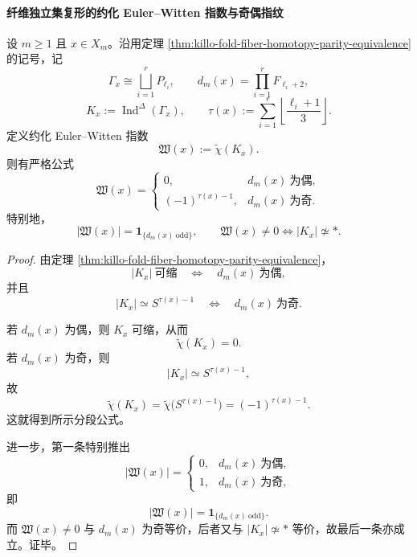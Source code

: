 \paragraph{纤维独立集复形的约化 Euler--Witten 指数与奇偶指纹}

\begin{theorem}\label{thm:xi-time-part62dg-fiber-reduced-euler-witten-parity}
设 \(m\ge 1\) 且 \(x\in X_m\)。沿用定理 \ref{thm:killo-fold-fiber-homotopy-parity-equivalence} 的记号，记
\[
\Gamma_x\cong\bigsqcup_{i=1}^{r}P_{\ell_i},
\qquad
d_m(x)=\prod_{i=1}^{r}F_{\ell_i+2},
\]
\[
K_x:=\operatorname{Ind}^{\Delta}(\Gamma_x),
\qquad
\tau(x):=\sum_{i=1}^{r}\left\lfloor\frac{\ell_i+1}{3}\right\rfloor.
\]
定义约化 Euler--Witten 指数
\[
\mathfrak W(x):=\widetilde\chi(K_x).
\]
则有严格公式
\[
\mathfrak W(x)=
\begin{cases}
0,& d_m(x)\ \text{为偶},\\[1mm]
(-1)^{\tau(x)-1},& d_m(x)\ \text{为奇}.
\end{cases}
\]
特别地，
\[
|\mathfrak W(x)|=\mathbf 1_{\{d_m(x)\ \mathrm{odd}\}},
\qquad
\mathfrak W(x)\neq 0\iff |K_x|\not\simeq *.
\]
\end{theorem}
\begin{proof}
由定理 \ref{thm:killo-fold-fiber-homotopy-parity-equivalence}，
\[
|K_x|\ \text{可缩}
\quad\Longleftrightarrow\quad
d_m(x)\ \text{为偶},
\]
并且
\[
|K_x|\simeq S^{\tau(x)-1}
\quad\Longleftrightarrow\quad
d_m(x)\ \text{为奇}.
\]

若 \(d_m(x)\) 为偶，则 \(K_x\) 可缩，从而
\[
\widetilde\chi(K_x)=0.
\]
若 \(d_m(x)\) 为奇，则
\[
|K_x|\simeq S^{\tau(x)-1},
\]
故
\[
\widetilde\chi(K_x)=\widetilde\chi\!\bigl(S^{\tau(x)-1}\bigr)=(-1)^{\tau(x)-1}.
\]
这就得到所示分段公式。

进一步，第一条特别推出
\[
|\mathfrak W(x)|=
\begin{cases}
0,& d_m(x)\ \text{为偶},\\
1,& d_m(x)\ \text{为奇},
\end{cases}
\]
即
\[
|\mathfrak W(x)|=\mathbf 1_{\{d_m(x)\ \mathrm{odd}\}}.
\]
而 \(\mathfrak W(x)\neq 0\) 与 \(d_m(x)\) 为奇等价，后者又与 \(|K_x|\not\simeq *\) 等价，故最后一条亦成立。证毕。
\end{proof}
